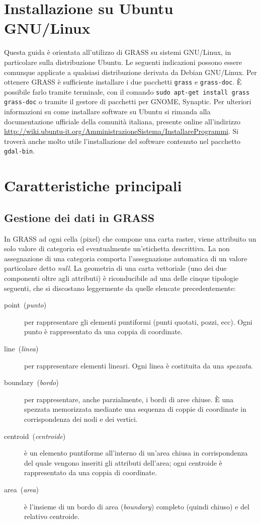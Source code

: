 \section{Installazione su Ubuntu GNU/Linux\label{sec:Installazione-su-Ubuntu}}
	Questa guida è orientata all'utilizzo di GRASS su sistemi GNU/Linux, in particolare sulla distribuzione Ubuntu. Le seguenti indicazioni possono essere comunque applicate a qualsiasi distribuzione derivata da Debian GNU/Linux. Per ottenere GRASS è sufficiente installare i due pacchetti \texttt{grass} e \texttt{grass-doc}. È possibile farlo tramite terminale, con il comando \texttt{sudo apt-get install grass grass-doc} o tramite il gestore di pacchetti per GNOME, Synaptic. Per ulteriori informazioni su come installare software su Ubuntu si rimanda alla documentazione ufficiale della comunità italiana, presente online all'indirizzo \url{http://wiki.ubuntu-it.org/AmministrazioneSistema/InstallareProgrammi}. Si troverà anche molto utile l'installazione del software contenuto nel pacchetto \texttt{gdal-bin}.


\section{Caratteristiche principali\cite{uniparma}}

	\subsection{Gestione dei dati in GRASS}
		In GRASS ad ogni cella (pixel) che compone una carta raster, viene attribuito un solo valore di categoria ed eventualmente un'etichetta descrittiva. La non assegnazione di una categoria comporta l'assegnazione automatica di un valore particolare detto \emph{null}. La geometria di una carta vettoriale (uno dei due componenti oltre agli attributi) è riconducibile ad una delle cinque tipologie seguenti, che si discostano leggermente da quelle elencate precedentemente:
		
		\begin{description}
			\item [{point~(\emph{punto})}] per rappresentare gli elementi puntiformi (punti quotati, pozzi, ecc). Ogni punto è rappresentato da una coppia di coordinate.
			\item [{line~(\emph{linea})}] per rappresentare elementi lineari. Ogni linea è costituita da una \emph{spezzata}.
			\item [{boundary~(\emph{bordo})}] per rappresentare, anche parzialmente, i bordi di aree chiuse. È una spezzata memorizzata mediante una sequenza di coppie di coordinate in corrispondenza dei nodi e dei vertici.
			\item [{centroid~(\emph{centroide})}] è un elemento puntiforme all'interno di un'area chiusa in corrispondenza del quale vengono inseriti gli attributi dell'area; ogni centroide è rappresentato da una coppia di coordinate.
			\item [{area~(\emph{area})}] è l'insieme di un bordo di area (\emph{boundary}) completo (quindi chiuso) e del relativo centroide.
		\end{description}
		
